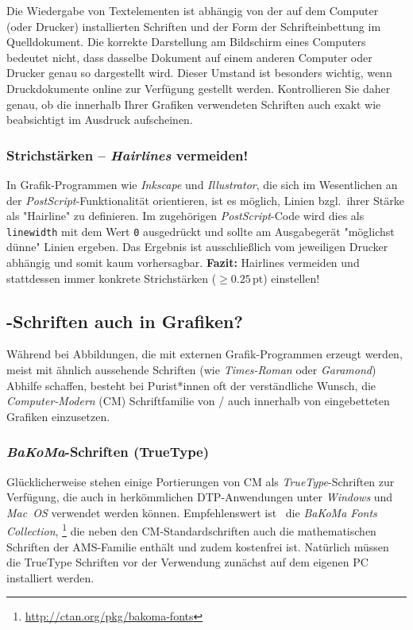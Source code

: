 Die Wiedergabe von Textelementen ist abhängig von der auf dem
Computer (oder Drucker) installierten Schriften und der Form der
Schrifteinbettung im Quelldokument. Die korrekte Darstellung am
Bildschirm eines Computers bedeutet nicht, dass dasselbe Dokument
auf einem anderen Computer oder Drucker genau so dargestellt wird.
Dieser Umstand ist besonders wichtig, wenn Druckdokumente online
zur Verfügung gestellt werden. Kontrollieren Sie daher genau, ob
die innerhalb Ihrer Grafiken verwendeten Schriften auch exakt wie
beabsichtigt im Ausdruck aufscheinen.


\subsubsection{Strichstärken -- \emph{Hairlines} vermeiden!}

In Grafik-Programmen wie \emph{Inkscape} und \emph{Illustrator},
die sich im Wesentlichen an der \emph{PostScript}-Funktionalität
orientieren, ist es möglich, Linien bzgl.\ ihrer Stärke als
"Hairline" zu definieren. Im zugehörigen \emph{PostScript}-Code
wird dies als \texttt{linewidth} mit dem Wert \texttt{0} ausgedrückt und
sollte am Ausgabegerät "möglichst dünne" Linien ergeben. 
Das Ergebnis ist ausschließlich vom jeweiligen Drucker
abhängig und somit kaum vorhersagbar.
\textbf{Fazit:} Hairlines vermeiden und stattdessen immer konkrete
Strichstärken ($\geq 0.25\,\mathrm{pt}$) einstellen!





\subsection{\tex-Schriften auch in Grafiken?}
\label{sec:tex-schriften-in-grafiken}

Während bei Abbildungen, die mit externen
Grafik-Programmen erzeugt werden, meist mit ähnlich aussehende
Schriften (wie \emph{Times-Roman} oder \emph{Garamond}) Abhilfe schaffen,
besteht bei Purist*innen oft der verständliche Wunsch, die 
\emph{Computer-Modern} (CM) Schriftfamilie von {\tex}/{\latex} auch
innerhalb von eingebetteten Grafiken einzusetzen.

\subsubsection{\emph{BaKoMa}-Schriften (TrueType)}

Glücklicherweise stehen einige Portierungen von CM als {\em
TrueType}-Schriften zur Verfügung, die auch in herkömmlichen
DTP-Anwendungen unter \emph{Windows} und \emph{Mac~OS} verwendet werden
können. Empfehlenswert ist \zB\ die \emph{BaKoMa Fonts Collection},%
\footnote{\url{http://ctan.org/pkg/bakoma-fonts}}
die neben den CM-Standardschriften auch die mathematischen Schriften
der AMS-Familie ent\-hält und zudem kostenfrei ist. Natürlich
müssen die TrueType Schriften vor der Verwendung zunächst auf dem
eigenen PC installiert werden. 


